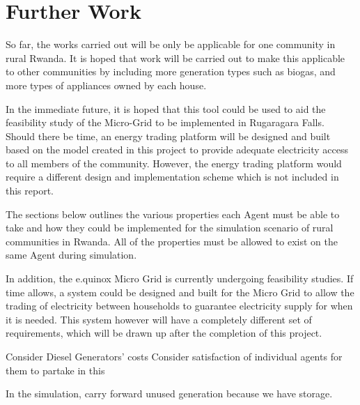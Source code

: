\chapter{Further Work}
\label{Further Work}

So far, the works carried out will be only be applicable for one community in rural Rwanda. It is hoped that work will be carried out to make this applicable to other communities by including more generation types such as biogas, and more types of appliances owned by each house.

In the immediate future, it is hoped that this tool could be used to aid the feasibility study of the Micro-Grid to be implemented in Rugaragara Falls. Should there be time, an energy trading platform will be designed and built based on the model created in this project to provide adequate electricity access to all members of the community. However, the energy trading platform would require a different design and implementation scheme which is not included in this report.

The sections below outlines the various properties each Agent must be able to take and how they could be implemented for the simulation scenario of rural communities in Rwanda. All of the properties must be allowed to exist on the same Agent during simulation.

In addition, the e.quinox Micro Grid is currently undergoing feasibility studies. If time allows, a system could be designed and built for the Micro Grid to allow the trading of electricity between households to guarantee electricity supply for when it is needed. This system however will have a completely different set of requirements, which will be drawn up after the completion of this project.

Consider Diesel Generators' costs 
Consider satisfaction of individual agents for them to partake in this

In the simulation, carry forward unused generation because we have storage.